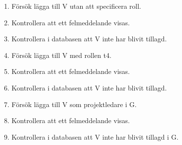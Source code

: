 \documentclass[a4paper]{article}
\begin{document}
\begin{FT}
\begin{enumerate}
\item Försök lägga till V utan att specificera roll.
\item Kontrollera att ett felmeddelande visas.
\item Kontrollera i databasen att V inte har blivit tillagd.
\item Försök lägga till V med rollen t4.
\item Kontrollera att ett felmeddelande visas.
\item Kontrollera i databasen att V inte har blivit tillagd.
\item Försök lägga till V som projektledare i G.
\item Kontrollera att ett felmeddelande visas.
\item Kontrollera i databasen att V inte har blivit tillagd i G.
\end{enumerate}
\end{FT}

\end{document}
